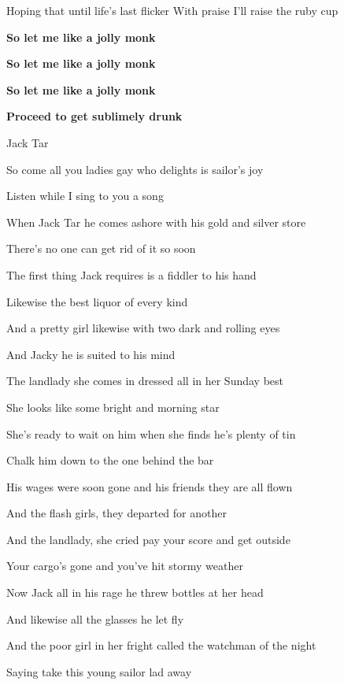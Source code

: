 \documentclass[letterpaper,9pt]{article}
\begin{document}
Hoping that until life's last flicker With praise I'll raise the ruby cup

\hfill

\textbf{So let me like a jolly monk
}

\textbf{So let me like a jolly monk
}

\textbf{So let me like a jolly monk
}

\textbf{Proceed to get sublimely drunk}

\newpage
{}
\huge
Jack Tar

\hfill

\Large
So come all you ladies gay who delights is sailor’s joy

Listen while I sing to you a song

When Jack Tar he comes ashore with his gold and silver store

There’s no one can get rid of it so soon

\hfill

The first thing Jack requires is a fiddler to his hand

Likewise the best liquor of every kind

And a pretty girl likewise with two dark and rolling eyes

And Jacky he is suited to his mind

\hfill

The landlady she comes in dressed all in her Sunday best

She looks like some bright and morning star

She’s ready to wait on him when she finds he’s plenty of tin

Chalk him down to the one behind the bar

\hfill

His wages were soon gone and his friends they are all flown

And the flash girls, they departed for another

And the landlady, she cried pay your score and get outside

Your cargo’s gone and you’ve hit stormy weather

\hfill

Now Jack all in his rage he threw bottles at her head

And likewise all the glasses he let fly

And the poor girl in her fright called the watchman of the night

Saying take this young sailor lad away
\end{document}
